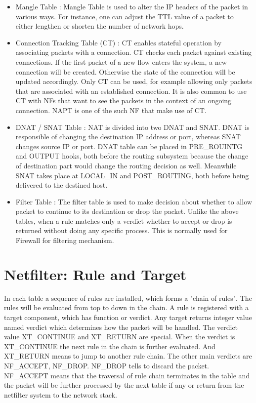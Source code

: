 \begin{itemize}
	\item Mangle Table : Mangle Table is used to alter the IP headers of the packet in various ways. For instance, one can adjust the TTL value of a packet to either lengthen or shorten the number of network hops. 
	\item Connection Tracking Table (CT) : CT enables stateful operation by associating packets with a connection. CT checks each packet against existing connections. If the first packet of a new flow enters the system, a new connection will be created. Otherwise the state of the connection will be updated accordingly. Only CT can be used, for example allowing only packets that are associated with an established connection. It is also common to use CT with NFs that want to see the packets in the context of an ongoing connection. NAPT is one of the such NF that make use of CT.
	\item DNAT / SNAT Table : NAT is divided into two DNAT and SNAT. DNAT is responsible of changing the destination IP address or port, whereas SNAT changes source IP or port. DNAT table can be placed in PRE\_ROUINTG and OUTPUT hooks, both before the routing subsystem because the change of destination part would change the routing decision as well. Meanwhile SNAT takes place at LOCAL\_IN and POST\_ROUTING, both before being delivered to the destined host. 
	\item Filter Table : The filter table is used to make decision about whether to allow packet to continue to its destination or drop the packet. Unlike the above tables, when a rule matches only a verdict whether to accept or drop is returned without doing any specific process. This is normally used for Firewall for filtering mechanism. 
\end{itemize}

\section{Netfilter: Rule and Target}
In each table a sequence of rules are installed, which forms a "chain of rules". The rules will be evaluated from top to down in the chain. A rule is registered with a target component, which has function or verdict. Any target returns integer value named verdict which determines how the packet will be handled.
 The verdict value XT\_CONTINUE and XT\_RETURN are special. When the verdict is XT\_CONTINUE the next rule in the chain is further evaluated. And XT\_RETURN means to jump to another rule chain. The other main verdicts are NF\_ACCEPT, NF\_DROP. NF\_DROP tells to discard the packet. NF\_ACCEPT means that the traversal of rule chain terminates in the table and the packet will be further processed by the next table if any or return from the netfilter system to the network stack. 
 
